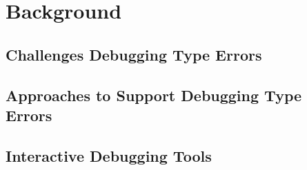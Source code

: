 


\chapter{Background}
\label{chapter2} 




\section{Challenges Debugging Type Errors}

\section{Approaches to Support Debugging Type Errors}

\section{Interactive Debugging Tools}